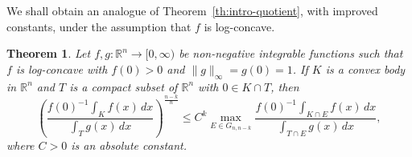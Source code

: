 \documentclass[11pt,leqno]{article}
\newtheorem{theorem}{Theorem}[section]
\theoremstyle{definition}
\theoremstyle{remark}
\numberwithin{equation}{section}
\newcommand{\ls}{\leqslant}
\newcommand{\1}{\textbf{1}}
\begin{document}
We shall obtain an analogue of Theorem~\ref{th:intro-quotient}, with improved constants, under the assumption that $f$ is log-concave.

\begin{theorem}\label{th:quotient}Let $f,g:{\mathbb R}^n\to [0,\infty)$ be non-negative integrable functions such that
$f$ is log-concave with $f(0)>0$ and $\|g\|_\infty=g(0)=1$.
If $K$ is a convex body in ${\mathbb R}^n$ and $T$ is a compact subset of ${\mathbb R}^n$ with $0\in K\cap T$, then
\begin{equation}\label{eq:quotient}
\left(\frac{f(0)^{-1}\int_Kf(x)\,dx}{\int_T g(x)\,dx}\right)^{\frac{n-k}{n}}  \ls C^k
\max_{E\in G_{n,n-k}} \frac{f(0)^{-1}\int_{K\cap E} f(x)\,dx}{\int_{T\cap E} g(x)\,dx},
\end{equation}
where $C>0$ is an absolute constant.
\end{theorem}
\end{document}
